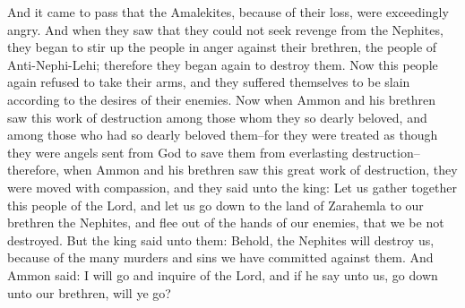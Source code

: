 And it came to pass that the Amalekites, because of their loss, were exceedingly angry. And when they saw that they could not seek revenge from the Nephites, they began to stir up the people in anger against their brethren, the people of Anti-Nephi-Lehi; therefore they began again to destroy them.
\bverse \iffalse Now this people again refused to take their arms, and they suffered themselves to be slain according to the desires of their enemies. \fi
Now this people again refused to take their arms, and they suffered themselves to be slain according to the desires of their enemies.
\bverse \iffalse Now when Ammon and his brethren saw this work of destruction among those whom they so dearly beloved, and among those who had so dearly beloved them--for they were treated as though they were angels sent from God to save them from everlasting destruction--therefore, when Ammon and his brethren saw this great work of destruction, they were moved with compassion, and they said unto the king: \fi
Now when Ammon and his brethren saw this work of destruction among those whom they so dearly beloved, and among those who had so dearly beloved them--for they were treated as though they were angels sent from God to save them from everlasting destruction--therefore, when Ammon and his brethren saw this great work of destruction, they were moved with compassion, and they said unto the king:
\bverse \iffalse Let us gather together this people of the Lord, and let us go down to the land of Zarahemla to our brethren the Nephites, and flee out of the hands of our enemies, that we be not destroyed. \fi
Let us gather together this people of the Lord, and let us go down to the land of Zarahemla to our brethren the Nephites, and flee out of the hands of our enemies, that we be not destroyed.
\bverse \iffalse But the king said unto them: Behold, the Nephites will destroy us, because of the many murders and sins we have committed against them. \fi
But the king said unto them: Behold, the Nephites will destroy us, because of the many murders and sins we have committed against them.
\bverse \iffalse And Ammon said: I will go and inquire of the Lord, and if he say unto us, go down unto our brethren, will ye go? \fi
And Ammon said: I will go and inquire of the Lord, and if he say unto us, go down unto our brethren, will ye go?
\bverse \iffalse And the king said unto him: Yea, if the Lord saith unto us go, we will go down unto our brethren, and we will be their slaves until we repair unto them the many murders and sins which we have committed against them. \fi
